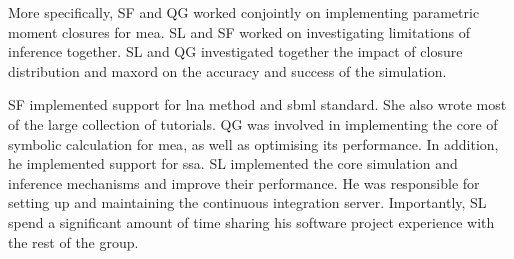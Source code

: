 More specifically, SF and QG worked conjointly on implementing parametric moment closures for \gls{mea}.
SL and SF worked on  investigating limitations of inference together.
SL and QG investigated together the impact of closure distribution and \gls{maxord} on the accuracy and success of the simulation.


SF implemented support for \gls{lna} method and \gls{sbml} standard.
She also wrote most of the large collection of tutorials.
QG was involved in implementing the core of symbolic calculation for \gls{mea}, as well as optimising its performance.
In addition, he implemented support for \gls{ssa}.
SL implemented the core simulation and inference mechanisms and improve their performance.
He was responsible for setting up and maintaining the continuous integration server.
Importantly, SL spend a significant amount of time sharing his software project experience with the rest of the group.


